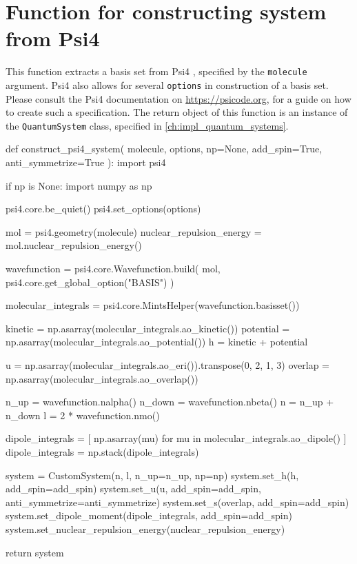 \section{Function for constructing system from Psi4}
\label{sec:custom_system_psi4}

This function extracts a basis set from Psi4 \cite{parrish2017psi4}, specified 
by the \lstinline{molecule} argument. Psi4 also allows for several \lstinline{options}
in construction of a basis set. Please consult the Psi4 documentation on 
\url{https://psicode.org}, for a guide on how to create such a specification.
The return object of this function is an instance of the
\lstinline{QuantumSystem} class, specified in
\autoref{ch:impl_quantum_systems}.

\begin{python}
def construct_psi4_system(
    molecule, options, np=None, add_spin=True, anti_symmetrize=True
):
    import psi4

    if np is None:
        import numpy as np

    psi4.core.be_quiet()
    psi4.set_options(options)

    mol = psi4.geometry(molecule)
    nuclear_repulsion_energy = mol.nuclear_repulsion_energy()

    wavefunction = psi4.core.Wavefunction.build(
        mol, psi4.core.get_global_option("BASIS")
    )

    molecular_integrals = psi4.core.MintsHelper(wavefunction.basisset())

    kinetic = np.asarray(molecular_integrals.ao_kinetic())
    potential = np.asarray(molecular_integrals.ao_potential())
    h = kinetic + potential

    u = np.asarray(molecular_integrals.ao_eri()).transpose(0, 2, 1, 3)
    overlap = np.asarray(molecular_integrals.ao_overlap())

    n_up = wavefunction.nalpha()
    n_down = wavefunction.nbeta()
    n = n_up + n_down
    l = 2 * wavefunction.nmo()

    dipole_integrals = [
        np.asarray(mu) for mu in molecular_integrals.ao_dipole()
    ]
    dipole_integrals = np.stack(dipole_integrals)

    system = CustomSystem(n, l, n_up=n_up, np=np)
    system.set_h(h, add_spin=add_spin)
    system.set_u(u, add_spin=add_spin, anti_symmetrize=anti_symmetrize)
    system.set_s(overlap, add_spin=add_spin)
    system.set_dipole_moment(dipole_integrals, add_spin=add_spin)
    system.set_nuclear_repulsion_energy(nuclear_repulsion_energy)

    return system
\end{python}

